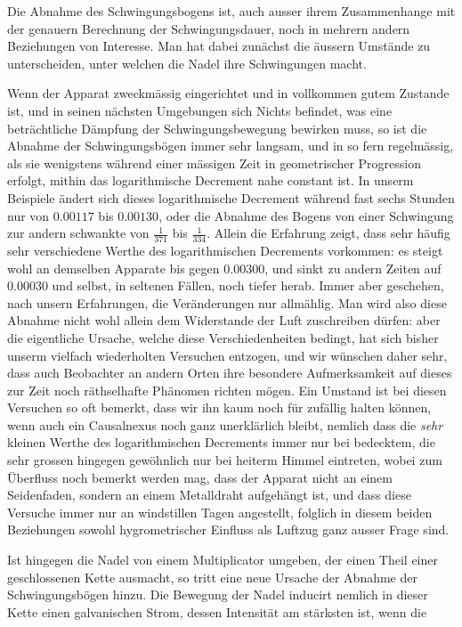 Die Abnahme des Schwingungsbogens ist, auch ausser ihrem Zusammenhange mit der genauern Berechnung der Schwingungsdauer, noch in mehrern andern Beziehungen von Interesse. Man hat dabei zunächst die äussern Umstände zu unterscheiden, unter welchen die Nadel ihre Schwingungen macht.

Wenn der Apparat zweckmässig eingerichtet und in vollkommen gutem Zustande ist, und in seinen nächsten Umgebungen sich Nichts befindet, was eine beträchtliche Dämpfung der Schwingungsbewegung bewirken muss, so ist die Abnahme der Schwingungsbögen immer sehr langsam, und in so fern regelmässig, als sie wenigstens während einer mässigen Zeit in geometrischer Progression erfolgt, mithin das logarithmische Decrement nahe constant ist. In unserm Beispiele ändert sich dieses logarithmische Decrement während fast sechs Stunden nur von $0.00117$ bis $0.00130$, oder die Abnahme des Bogens von einer Schwingung zur andern schwankte von $\tfrac1{371}$ bis $\tfrac1{334}$. Allein die Erfahrung zeigt, dass sehr häufig sehr verschiedene Werthe des logarithmischen Decrements vorkommen: es steigt wohl an demselben Apparate bis gegen $0.00300$, und sinkt zu andern Zeiten auf $0.00030$ und selbst, in seltenen Fällen, noch tiefer herab. Immer aber geschehen, nach unsern Erfahrungen, die Veränderungen nur allmählig. Man wird also diese Abnahme nicht wohl allein dem Widerstande der Luft zuschreiben dürfen: aber die eigentliche Ursache, welche diese Verschiedenheiten bedingt, hat sich bisher unserm vielfach wiederholten Versuchen entzogen, und wir wünschen daher sehr, dass auch Beobachter an andern Orten ihre besondere Aufmerksamkeit auf dieses zur Zeit noch räthselhafte Phänomen richten mögen. Ein Umstand ist bei diesen Versuchen so oft bemerkt, dass wir ihn kaum noch für zufällig halten können, wenn auch ein Causalnexus noch ganz unerklärlich bleibt, nemlich dass die \textit{sehr} kleinen Werthe des logarithmischen Decrements immer nur bei bedecktem, die sehr grossen hingegen gewöhnlich nur bei heiterm Himmel eintreten, wobei zum Überfluss noch bemerkt werden mag, dass der Apparat nicht an einem Seidenfaden, sondern an einem Metalldraht aufgehängt ist, und dass diese Versuche immer nur an windstillen Tagen angestellt, folglich in diesem beiden Beziehungen sowohl hygrometrischer Einfluss als Luftzug ganz ausser Frage sind.

Ist hingegen die Nadel von einem Multiplicator umgeben, der einen Theil einer geschlossenen Kette ausmacht, so tritt eine neue Ursache der Abnahme der Schwingungsbögen hinzu. Die Bewegung der Nadel inducirt nemlich in dieser Kette einen galvanischen Strom, dessen Intensität am stärksten ist, wenn die
